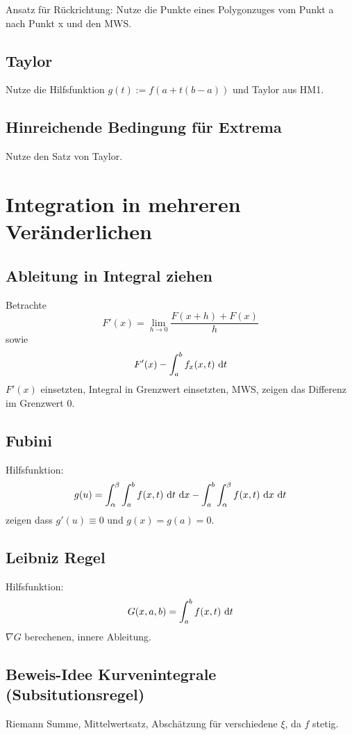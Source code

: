   Ansatz für Rückrichtung: Nutze die Punkte eines Polygonzuges vom Punkt a nach
  Punkt x und den MWS.

  \subsection{Taylor}
  Nutze die Hilfsfunktion $g(t):=f(a+t(b-a))$ und Taylor aus HM1.

  \subsection{Hinreichende Bedingung für Extrema}
  Nutze den Satz von Taylor.



 \section{Integration in mehreren Veränderlichen}
 \subsection{Ableitung in Integral ziehen}
 Betrachte
 \begin{equation*}
     F'(x) = \lim_{h \to 0} \frac{F(x + h) + F(x)}{h}
 \end{equation*}
 sowie
 \begin{equation*}
     F'(x) - \int_a^b f_x(x,t) \text{ d}t
 \end{equation*}
 $F'(x)$ einsetzten, Integral in Grenzwert einsetzten, MWS,
 zeigen das Differenz im Grenzwert $0$.
 \subsection{Fubini}
 Hilfsfunktion:
 \begin{equation*}
     g(u) = \int_\alpha^\beta \int_a^b f(x,t) \text{ d}t \text{ d}x - \int_a^b \int_\alpha^\beta
     f(x,t) \text{ d}x \text{ d}t
 \end{equation*}
 zeigen dass $g'(u) \equiv 0$ und $g(x) = g(a) = 0$.

 \subsection{Leibniz Regel}
 Hilfsfunktion:
 \begin{equation*}
     G(x,a,b) = \int_a^b f(x,t) \text{ d}t
 \end{equation*}
 $\nabla G$ berechenen, innere Ableitung.

 \subsection{Beweis-Idee Kurvenintegrale (Subsitutionsregel)}
 Riemann Summe, Mittelwertsatz, Abschätzung für verschiedene $\xi$, da $f$ stetig.


